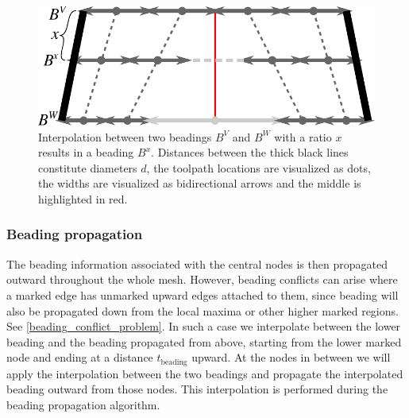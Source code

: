 \begin{figure}
\centering
\includegraphics[width=.8\columnwidth]{sources/method/beading_interpolation_v2.pdf}
\caption{
Interpolation between two beadings $B^V$ and $B^W$ with a ratio $x$ results in a beading $B^x$.
Distances between the thick black lines constitute diameters $d$,
the toolpath locations are visualized as dots,
the widths are visualized as bidirectional arrows
and the middle is highlighted in red.
}
\label{beading_interpolation}
\end{figure}


\subsubsection{Beading propagation}\label{section_beading_conflicts}
The beading information associated with the central nodes is then propagated outward throughout the whole mesh.
However, beading conflicts can arise where a marked edge has unmarked upward edges attached to them, since beading will also be propagated down from the local maxima or other higher marked regions.
See \cref{beading_conflict_problem}.
In such a case we interpolate between the lower beading and the beading propagated from above,
starting from the lower marked node and ending at a distance $t_\text{beading}$ upward.
At the nodes in between we will apply the interpolation between the two beadings and propagate the interpolated beading outward from those nodes.
This interpolation is performed during the beading propagation algorithm.


